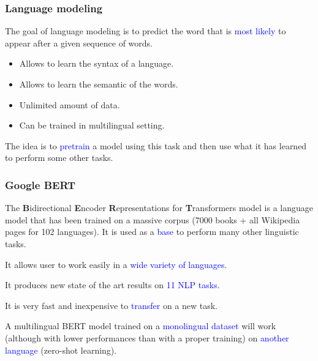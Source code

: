 \documentclass[9pt]{beamer}
\begin{document}
\begin{frame}

  \frametitle{Language modeling}

  The goal of language modeling is to predict the word that is
  \textcolor{blue}{most likely} to appear after a given sequence of
  words.

  \begin{figure}
    \scalebox{0.7}{
      
    }
  \end{figure}

  \begin{itemize}
  \item Allows to learn the syntax of a language.
  \item Allows to learn the semantic of the words.
  \item Unlimited amount of data.
  \item Can be trained in multilingual setting.
  \end{itemize}

  \medskip

  The idea is to \textcolor{blue}{pretrain} a model using this task
  and then use what it has learned to perform some other tasks.
\end{frame}

\begin{frame}
  \frametitle{Google BERT}

  The \textbf{B}idirectional \textbf{E}ncoder \textbf{R}epresentations
  for \textbf{T}ransformers model is a language model that has been
  trained on a massive corpus (7000 books + all Wikipedia pages for
  102 languages). It is used as a \textcolor{blue}{base} to perform
  many other linguistic tasks.

  \bigskip

  It allows user to work easily in a \textcolor{blue}{wide variety of
    languages}.

  \bigskip

  It produces new state of the art results on \textcolor{blue}{11 NLP
    tasks}.

  \bigskip

  It is very fast and inexpensive to \textcolor{blue}{transfer} on a
  new task.

  \bigskip

  A multilingual BERT model trained on a \textcolor{blue}{monolingual
    dataset} will work (although with lower performances than with a
  proper training) on \textcolor{blue}{another language} (zero-shot
  learning).
\end{frame}
\end{document}
